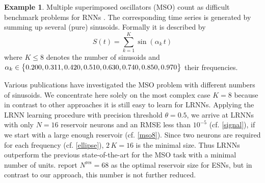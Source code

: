 \documentclass[twoside,11pt]{article}
\theoremstyle{definition}
\newtheorem{exmp}{Example}
\begin{document}
\begin{exmp}\label{exmp}
Multiple superimposed oscillators (MSO) count as difficult benchmark problems
for RNNs \citep{KLB12,SW+07}. The corresponding time
series is generated by summing up several (pure) sinusoids. Formally
it is described by
	\[ S(t) = \sum\limits_{k=1}^K \sin(\alpha_k\,t) \]
where $K \le 8$ denotes the number of sinusoids and $\alpha_k \in \big\{ 0.200,
0.311, 0.420, 0.510, 0.630,\linebreak 0.740, 0.850, 0.970 \big\}$ their frequencies.
\end{exmp}

Various publications have investigated the MSO problem with different numbers of
sinusoids. We concentrate here solely on the most complex case $K=8$
because in contrast to other approaches it is still easy to learn for LRNNs.
Applying the LRNN learning procedure with precision threshold $\theta = 0.5$,
we arrive at LRNNs with only $N=16$ reservoir neurons and an RMSE less than
$10^{-5}$ (cf. \cref{signal}), if we start with a large enough reservoir (cf. \cref{mso8}). Since
two neurons are required for each frequency (cf. \cref{ellipse}), $2\,K=16$ is
the minimal size. Thus LRNNs outperform the previous state-of-the-art for the
MSO task with a minimal number of units. \citet{KLB12} report $N^\mathrm{res} =
68$ as the optimal reservoir size for ESNs, but in contrast to our approach,
this number is not further reduced.
\end{document}
